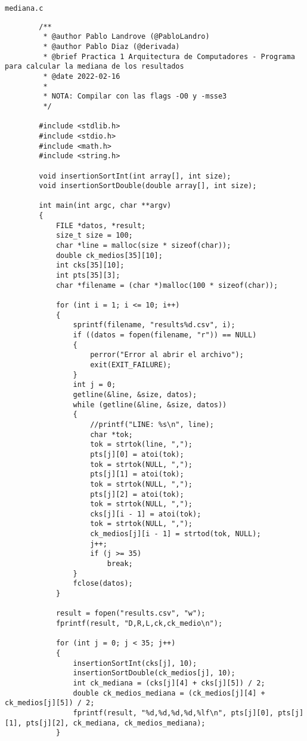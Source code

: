\documentclass[a4paper,twocolumn]{article}
\begin{document}
        
        \Large{\texttt{mediana.c}}
        \begin{lstlisting}
        /**
         * @author Pablo Landrove (@PabloLandro)
         * @author Pablo Diaz (@derivada)
         * @brief Practica 1 Arquitectura de Computadores - Programa para calcular la mediana de los resultados
         * @date 2022-02-16
         *
         * NOTA: Compilar con las flags -O0 y -msse3
         */
        
        #include <stdlib.h>
        #include <stdio.h>
        #include <math.h>
        #include <string.h>
        
        void insertionSortInt(int array[], int size);
        void insertionSortDouble(double array[], int size);
        
        int main(int argc, char **argv)
        {
            FILE *datos, *result;
            size_t size = 100;
            char *line = malloc(size * sizeof(char));
            double ck_medios[35][10];
            int cks[35][10];
            int pts[35][3];
            char *filename = (char *)malloc(100 * sizeof(char));
        
            for (int i = 1; i <= 10; i++)
            {
                sprintf(filename, "results%d.csv", i);
                if ((datos = fopen(filename, "r")) == NULL)
                {
                    perror("Error al abrir el archivo");
                    exit(EXIT_FAILURE);
                }
                int j = 0;
                getline(&line, &size, datos);
                while (getline(&line, &size, datos))
                {
                    //printf("LINE: %s\n", line);
                    char *tok;
                    tok = strtok(line, ",");
                    pts[j][0] = atoi(tok);
                    tok = strtok(NULL, ",");
                    pts[j][1] = atoi(tok);
                    tok = strtok(NULL, ",");
                    pts[j][2] = atoi(tok);
                    tok = strtok(NULL, ",");
                    cks[j][i - 1] = atoi(tok);
                    tok = strtok(NULL, ",");
                    ck_medios[j][i - 1] = strtod(tok, NULL);
                    j++;
                    if (j >= 35)
                        break;
                }
                fclose(datos);
            }
        
            result = fopen("results.csv", "w");
            fprintf(result, "D,R,L,ck,ck_medio\n");
        
            for (int j = 0; j < 35; j++)
            {
                insertionSortInt(cks[j], 10);
                insertionSortDouble(ck_medios[j], 10);
                int ck_mediana = (cks[j][4] + cks[j][5]) / 2;
                double ck_medios_mediana = (ck_medios[j][4] + ck_medios[j][5]) / 2;
                fprintf(result, "%d,%d,%d,%d,%lf\n", pts[j][0], pts[j][1], pts[j][2], ck_mediana, ck_medios_mediana);
            }
        

\end{lstlisting}
\end{document}
